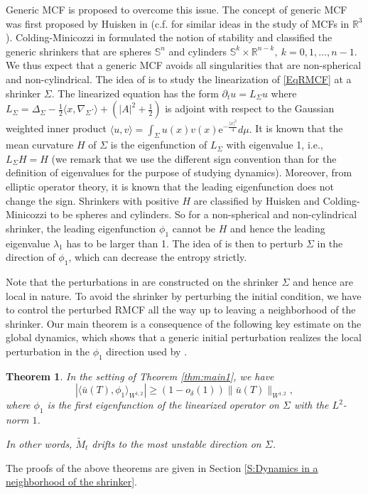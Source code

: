 \documentclass[12pt]{amsart}
\numberwithin{equation}{section}
\newtheorem{theorem}{Theorem}[section]
\numberwithin{equation}{section}
\newcommand{\dt}{\delta}
\newcommand{\R}{\mathbb{R}}
\begin{document}
	Generic MCF is proposed to overcome this issue. The concept of generic MCF was first proposed by Huisken in \cite{H} (c.f. \cite{AIC} for similar ideas in the study of MCFs in $\R^3$). Colding-Minicozzi in \cite{CM1} formulated the notion of stability and classified the generic shrinkers that are spheres $\mathbb S^n$ and cylinders $\mathbb S^k\times \R^{n-k},\ k=0,1,\ldots,n-1$. We thus expect that a generic MCF avoids all singularities that are non-spherical and non-cylindrical. The idea of \cite{CM1} is to study the linearization of \eqref{EqRMCF} at a shrinker $\Sigma$. The linearized equation has the form $\partial_t u=L_\Sigma u$ where $L_\Sigma=\Delta_{\Sigma}-\frac{1}{2}\langle x,\nabla_\Sigma \cdot \rangle+(|A|^2+\frac12)$ is adjoint with respect to the Gaussian weighted inner product $\langle u,v\rangle=\int_{\Sigma} u(x)v(x)\mathrm{e}^{-\frac{|x|^2}{4}}d\mu.$ It is known that the mean curvature $H$ of $\Sigma$ is the eigenfunction of $L_\Sigma$ with eigenvalue 1, i.e., $L_\Sigma H=H$ (we remark that we use the different sign convention than \cite{CM1} for the definition of eigenvalues for the purpose of studying dynamics). Moreover, from elliptic operator theory, it is known that the leading eigenfunction does not change the sign. Shrinkers with positive $H$ are classified by Huisken and Colding-Minicozzi to be spheres and cylinders. So for a non-spherical and non-cylindrical shrinker, the leading eigenfunction $\phi_1$ cannot be $H$ and hence the leading eigenvalue $\lambda_1$ has to be larger than 1. The idea of \cite{CM1} is then to perturb $\Sigma$ in the direction of $\phi_1$, which can decrease the entropy strictly.  
	
	Note that the perturbations in \cite{CM1} are constructed on the shrinker $\Sigma$ and hence are local in nature. To avoid the shrinker by perturbing the initial condition, we have to control the perturbed RMCF all the way up to leaving a neighborhood of the shrinker. Our main theorem is a consequence of the following key estimate on the global dynamics, which shows that a generic initial perturbation realizes the local perturbation in the $\phi_1$ direction used by \cite{CM1}. 
	
	\begin{theorem}\label{ThmMain}
		In the setting of Theorem \ref{thm:main1}, we have 
		$$|\langle\bar u(T),\phi_1\rangle_{W^{1,2}}|\geq (1-o_\dt(1))\|\bar u(T)\|_{W^{1,2}}, $$ where $\phi_1$ is the first eigenfunction of the linearized operator on $\Sigma$ with the $L^2$-norm $1$. 
		
		In other words, $\widetilde M_t$ drifts to the most unstable direction on $\Sigma$. 
		
	\end{theorem}
	The proofs of the above theorems are given in Section \ref{S:Dynamics in a neighborhood of the shrinker}. 
\end{document}
